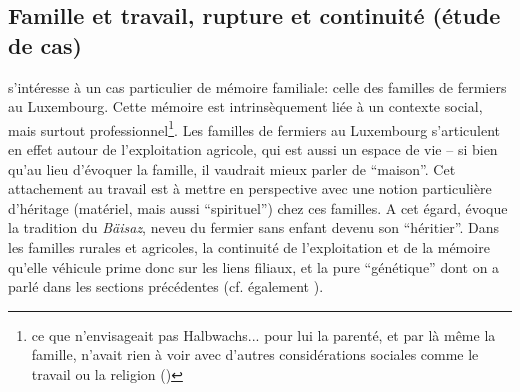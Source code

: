 \documentclass[french]{article}
\begin{document}
		\subsection{Famille et travail, rupture et continuité (étude de cas)}
			\cite{boesen2012} s'intéresse à un cas particulier de mémoire familiale: celle des familles de fermiers au Luxembourg. Cette mémoire est intrinsèquement liée à un contexte social, mais surtout professionnel\footnote{ce que n'envisageait pas Halbwachs... pour lui la parenté, et par là même la famille, n'avait rien à voir avec d'autres considérations sociales comme le travail ou la religion (\cite[p.~ 115]{halbwachs1925})}. Les familles de fermiers au Luxembourg s'articulent en effet autour de l'exploitation agricole, qui est aussi un espace de vie -- si bien qu'au lieu d'évoquer la famille, il vaudrait mieux parler de ``maison''. Cet attachement au travail est à mettre en perspective avec une notion particulière d'héritage (matériel, mais aussi ``spirituel'') chez ces familles. A cet égard, \cite{boesen2012} évoque la tradition du \textit{Bäisaz}, neveu du fermier sans enfant devenu son ``héritier''. Dans les familles rurales et agricoles, la continuité de l'exploitation et de la mémoire qu'elle véhicule prime donc sur les liens filiaux, et la pure ``génétique'' dont on a parlé dans les sections précédentes (cf. également \cite[p.~111]{halbwachs1925}).\\
			
\end{document}
